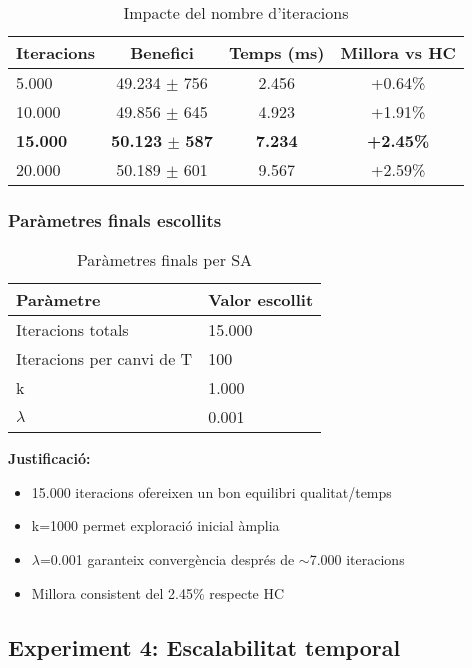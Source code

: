 \begin{table}[H]
\centering
\begin{tabular}{@{}lccc@{}}
\toprule
\textbf{Iteracions} & \textbf{Benefici} & \textbf{Temps (ms)} & \textbf{Millora vs HC} \\
\midrule
5.000 & 49.234 $\pm$ 756 & 2.456 & +0.64\% \\
10.000 & 49.856 $\pm$ 645 & 4.923 & +1.91\% \\
\textbf{15.000} & \textbf{50.123} $\pm$ \textbf{587} & \textbf{7.234} & \textbf{+2.45\%} \\
20.000 & 50.189 $\pm$ 601 & 9.567 & +2.59\% \\
\bottomrule
\end{tabular}
\caption{Impacte del nombre d'iteracions}
\label{tab:exp3-iteracions}
\end{table}

\subsubsection{Paràmetres finals escollits}

\begin{table}[H]
\centering
\begin{tabular}{@{}ll@{}}
\toprule
\textbf{Paràmetre} & \textbf{Valor escollit} \\
\midrule
Iteracions totals & 15.000 \\
Iteracions per canvi de T & 100 \\
k & 1.000 \\
$\lambda$ & 0.001 \\
\bottomrule
\end{tabular}
\caption{Paràmetres finals per SA}
\label{tab:exp3-final}
\end{table}

\textbf{Justificació:}
\begin{itemize}
    \item 15.000 iteracions ofereixen un bon equilibri qualitat/temps
    \item k=1000 permet exploració inicial àmplia
    \item $\lambda$=0.001 garanteix convergència després de $\sim$7.000 iteracions
    \item Millora consistent del 2.45\% respecte HC
\end{itemize}

\subsection{Experiment 4: Escalabilitat temporal}

